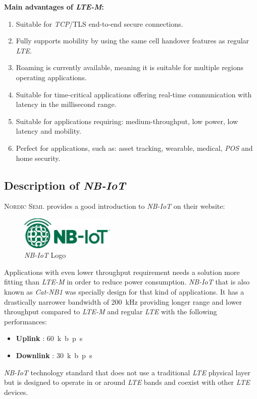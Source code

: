 \documentclass[report.tex]{subfiles}
\begin{document}
\begin{flushleft}
\textbf{Main advantages of \textit{LTE-M}:}
\end{flushleft}
\begin{enumerate}
\item Suitable for \textit{TCP}/{TLS} end-to-end secure connections.
\item Fully supports mobility by using the same cell handover features as regular \textit{LTE}.
\item Roaming is currently available, meaning it is suitable for multiple regions operating applications.
\item Suitable for time-critical applications offering real-time communication with latency in the millisecond range.
\item Suitable for applications requiring: medium-throughput, low power, low latency and mobility.
\item Perfect for applications, such as: asset tracking, wearable, medical, \textit{POS} and home security.
\end{enumerate}


\subsection{Description of \textit{NB-IoT}}

\textsc{Nordic Semi.} provides a good introduction to \textit{NB-IoT} on their website\cite{LTEM_NBIOT}:

\begin{figure}[H]
\centering
	\includegraphics[width=0.4\textwidth]{Include/Figure/research/NBIOT_logo.png}
	\caption{\textit{NB-IoT} Logo\cite{LTEM_NBIOT}}
\label{fig:nbiotlogo}
\end{figure}

Applications with even lower throughput requirement needs a solution more fitting than \textit{LTE-M} in order to reduce power consumption. \textit{NB-IoT} that is also known as \textit{Cat-NB1} was specially design for that kind of applications. It has a drastically narrower bandwidth of \SI{200}{\kilo\hertz} providing longer range and lower throughput compared to \textit{LTE-M} and regular \textit{LTE} with the following performances:
\begin{itemize}
\item \textbf{Uplink} : \SI{60}{k b p s}
\item \textbf{Downlink} : \SI{30}{k b p s} 
\end{itemize}
\textit{NB-IoT} technology standard that does not use a traditional \textit{LTE} physical layer but is designed to operate in or around \textit{LTE} bands and coexist with other \textit{LTE} devices.
\end{document}
